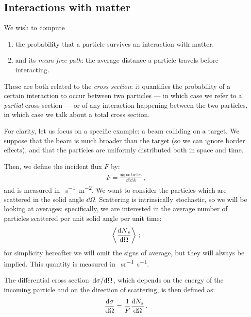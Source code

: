 \documentclass[main.tex]{subfiles}
\begin{document}
\subsection{Interactions with matter}

We wish to compute 
\begin{enumerate}
  \item the probability that a particle survives an interaction with matter;
  \item and its \emph{mean free path}: the average distance a particle travels before interacting. 
\end{enumerate}

These are both related to the \emph{cross section}: it quantifies the probability of a certain interaction to occur between two particles --- in which case we refer to a \emph{partial} cross section --- or of any interaction happening between the two particles, in which case we talk about a total cross section. 

For clarity, let us focus on a specific example: a beam colliding on a target. 
We suppose that the beam is much broader than the target (so we can ignore border effects), and that the particles are uniformly distributed both in space and time. 

Then, we define the incident flux \(F\) by:
%
\begin{align}
F = \frac{\text{\# particles}}{ \dd{t} \dd{A}}
\,,
\end{align}
%
and is measured in \SI{}{s^{-1} m^{-2}}.
We want to consider the particles which are scattered in the solid angle \(\dd{\Omega }\). 
Scattering is intrinsically stochastic, so we will be looking at averages: specifically, we are interested in the average number of particles scattered per unit solid angle per unit time: 
%
\begin{align}
\expval{\frac{ \dd{N}_{s}}{ \dd{\Omega }}}
\,;
\end{align}
%
for simplicity hereafter we will omit the signs of average, but they will always be implied. This quantity is measured in \SI{}{sr^{-1} s^{-1}}.


The differential cross section \(\dv*{\sigma }{\Omega }\), which depends on the energy of the incoming particle and on the direction of scattering, is then defined as: 
%
\begin{align}
\dv{\sigma }{\Omega } (E, \Omega ) = \frac{1}{F} \dv{N_{s}}{\Omega }
\,.
\end{align}
\end{document}
